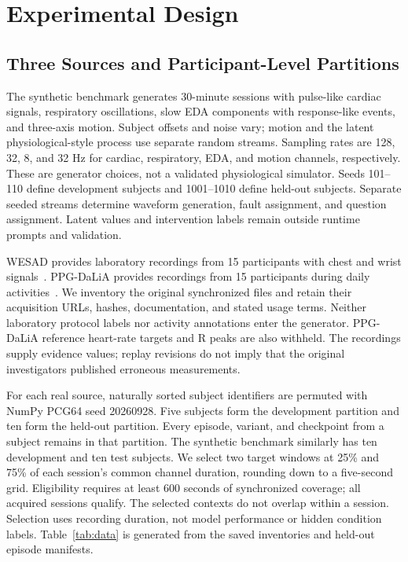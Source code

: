 \section{Experimental Design}
\label{sec:design}

\subsection{Three Sources and Participant-Level Partitions}

The synthetic benchmark generates 30-minute sessions with pulse-like cardiac
signals, respiratory oscillations, slow EDA components with response-like events,
and three-axis motion. Subject offsets and noise vary; motion and the latent
physiological-style process use separate random streams. Sampling rates are
128, 32, 8, and 32 Hz for cardiac, respiratory, EDA, and motion channels,
respectively. These are generator choices, not a validated physiological
simulator. Seeds 101--110 define development subjects and 1001--1010 define
held-out subjects. Separate seeded streams determine waveform generation,
fault assignment, and question assignment. Latent values and intervention
labels remain outside runtime prompts and validation.

WESAD provides laboratory recordings from 15 participants with chest and wrist
signals~\cite{schmidt2018,wesad}. PPG-DaLiA provides recordings from 15 participants
during daily activities~\cite{reiss2019,ppgdalia}. We inventory the original synchronized
files and retain their acquisition URLs, hashes, documentation, and stated usage
terms. Neither laboratory protocol labels nor activity annotations enter the
generator. PPG-DaLiA reference heart-rate targets and R peaks are also withheld.
The recordings supply evidence values; replay revisions do not imply that the
original investigators published erroneous measurements.

For each real source, naturally sorted subject identifiers are permuted with
NumPy PCG64 seed 20260928. Five subjects form the development partition and ten
form the held-out partition. Every episode, variant, and checkpoint from a
subject remains in that partition. The synthetic benchmark similarly has ten
development and ten test subjects. We select two target windows at 25\% and
75\% of each session's common channel duration, rounding down to a five-second
grid. Eligibility requires at least 600 seconds of synchronized coverage; all
acquired sessions qualify. The selected contexts do not overlap within a
session. Selection uses recording duration, not model performance or hidden
condition labels. Table~\ref{tab:data} is generated from the saved inventories
and held-out episode manifests.

